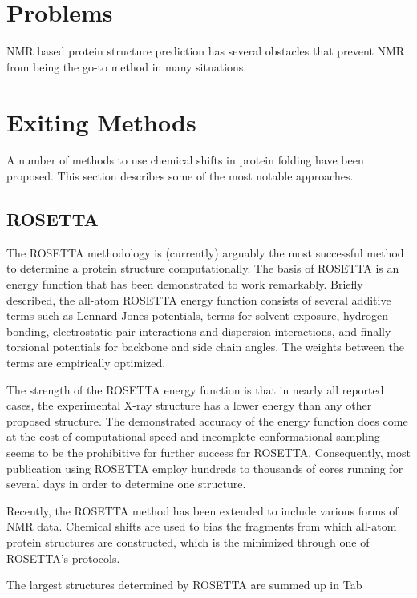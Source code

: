 \chapter{Problems}

NMR based protein structure prediction has several obstacles that prevent NMR from being the go-to method in many situations.





\chapter{Exiting Methods}
A number of methods to use chemical shifts in protein folding have been proposed. This section describes some of the most notable approaches.

\section{ROSETTA}

The ROSETTA methodology is (currently) arguably the most successful method to determine a protein structure computationally.
The basis of ROSETTA is an energy function that has been demonstrated to work remarkably. Briefly described, the all-atom ROSETTA energy function consists of several additive terms such as Lennard-Jones potentials, terms for solvent exposure, hydrogen bonding, electrostatic pair-interactions and dispersion interactions, and finally torsional potentials for backbone and side chain angles.
The weights between the terms are empirically optimized.

The strength of the ROSETTA energy function is that in nearly all reported cases, the experimental X-ray structure has a lower energy than any other proposed structure. The demonstrated accuracy of the energy function does come at the cost of computational speed and incomplete conformational sampling seems to be the prohibitive for further success for ROSETTA. Consequently, most publication using ROSETTA employ hundreds to thousands of cores running for several days in order to determine one structure.

Recently, the ROSETTA method has been extended to include various forms of NMR data. Chemical shifts are used to bias the fragments from which all-atom protein structures are constructed, which is the minimized through one of ROSETTA's protocols.

The largest structures determined by ROSETTA are summed up in Tab 

